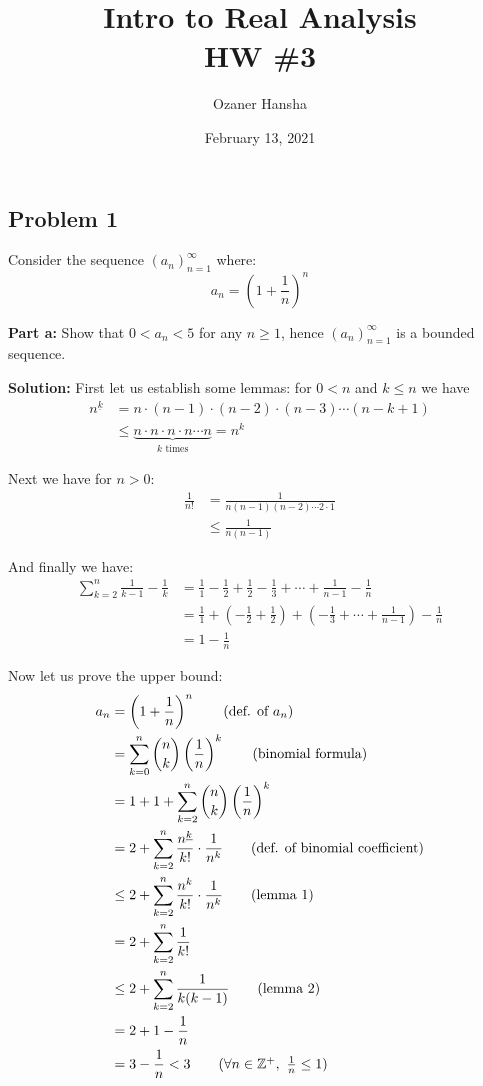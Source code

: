 \documentclass{article}
\newcommand{\Z}{\mathbb Z}
\newcommand{\fallfact}[2]{#1^{\underline {#2}}}
\begin{document}
\title{Intro to Real Analysis\\HW \#3}
\author{Ozaner Hansha}
\date{February 13, 2021}
\maketitle

\subsection*{Problem 1}
Consider the sequence $(a_n)_{n=1}^\infty$ where:
$$a_n=\left(1+\frac{1}{n}\right)^n$$

\noindent\textbf{Part a:} Show that $0<a_n<5$ for any $n\ge 1$, hence $(a_n)_{n=1}^\infty$ is a bounded sequence.
\bigskip

\noindent\textbf{Solution:} First let us establish some lemmas: for $0<n$ and $k\le n$ we have
\begin{align*}
  \fallfact{n}{k}&=n\cdot(n-1)\cdot(n-2)\cdot(n-3)\cdots (n-k+1)\tag{def. of falling factorial}\\
  &\le \underbrace{n\cdot n\cdot n\cdot n\cdots n}_{k\text{ times}}=n^k\tag{lemma 1}
\end{align*}

Next we have for $n>0$:
\begin{align*}
  \frac{1}{n!}&=\frac{1}{n(n-1)(n-2)\cdots2\cdot1}\tag{def. of factorial}\\
  &\le\frac{1}{n(n-1)}\tag{lemma 2}
\end{align*}

And finally we have:
\begin{align*}
  \sum_{k=2}^n\frac{1}{k-1}-\frac{1}{k}&=\frac{1}{1}-\frac{1}{2}+\frac{1}{2}-\frac{1}{3}+\cdots+\frac{1}{n-1}-\frac{1}{n}\\
  &=\frac{1}{1}+\left(-\frac{1}{2}+\frac{1}{2}\right)+\left(-\frac{1}{3}+\cdots+\frac{1}{n-1}\right)-\frac{1}{n}\tag{telescoping sum}\\
  &=1-\frac{1}{n}\tag{lemma 3}
\end{align*}

Now let us prove the upper bound:
\begin{align*}
  a_n&=\left(1+\frac{1}{n}\right)^n\tag{def. of $a_n$}\\
  &=\sum_{k=0}^n\binom{n}{k}\left(\frac{1}{n}\right)^k\tag{binomial formula}\\
  &=1+1+\sum_{k=2}^n\binom{n}{k}\left(\frac{1}{n}\right)^k\\
  &=2+\sum_{k=2}^n\frac{\fallfact{n}{k}}{k!}\cdot\frac{1}{n^k}\tag{def. of binomial coefficient}\\
  &\le2+\sum_{k=2}^n\frac{n^k}{k!}\cdot\frac{1}{n^k}\tag{lemma 1}\\
  &=2+\sum_{k=2}^n\frac{1}{k!}\\
  &\le2+\sum_{k=2}^n\frac{1}{k(k-1)}\tag{lemma 2}\\
  &=2+1-\frac{1}{n}\\
  &=3-\frac{1}{n} < 3\tag{$\forall n\in\Z^+,\,\,\frac{1}{n}\le1$}
\end{align*}
\end{document}
